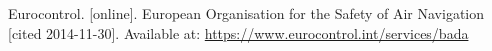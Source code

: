 \begin{thebibliography}{1}
Eurocontrol.
 [online].
\newblock European Organisation for the Safety of Air Navigation [cited 2014-11-30].
\newblock Available at: \url{https://www.eurocontrol.int/services/bada}






\end{thebibliography}
